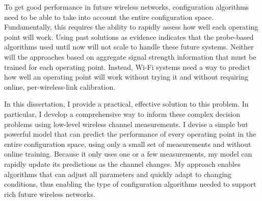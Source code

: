 To get good performance in future wireless networks, configuration algorithms need to be able to take into account the entire configuration space. Fundamentally, this requires the ability to rapidly assess how well each operating point will work. Using past solutions as evidence indicates that the probe-based algorithms used until now will not scale to handle these future systems. Neither will the approaches based on aggregate signal strength information that must be trained for each operating point. Instead, Wi-Fi systems need a way to predict how well an operating point will work without trying it and without requiring online, per-wireless-link calibration.


In this dissertation, I provide a practical, effective solution to this problem. In particular, I develop a comprehensive way to inform these complex decision problems using low-level wireless channel measurements. I devise a simple but powerful model that can predict the performance of every operating point in the entire configuration space, using only a small set of measurements and without online training. Because it only uses one or a few measurements, my model can rapidly update its predictions as the channel changes. My approach enables algorithms that can adjust all parameters and quickly adapt to changing conditions, thus enabling the type of configuration algorithms needed to support rich future wireless networks.

